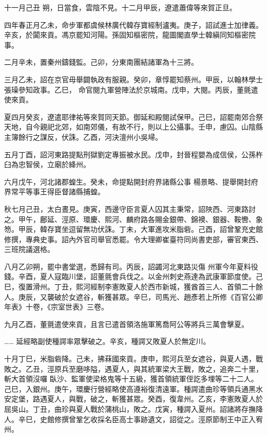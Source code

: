 \begin{pinyinscope}
 十一月己丑
 朔，日當食，雲陰不見。十二月甲辰，遼遣蕭偉等來賀正旦。



 四年春正月乙未，命步軍都虞候林廣代韓存寶經制瀘夷。庚子，詔試進士加律義。辛亥，於闐來貢。馮京罷知河陽。孫固知樞密院，龍圖閣直學士韓縝同知樞密院事。



 二月辛未，置秦州鑄錢監。己卯，分東南團結諸軍為十三將。



 三月乙未，詔在京官毋舉闢執政有服親。癸卯，章惇罷知蔡州。甲辰，以翰林學士張璪參知政事。乙巳，
 命官閱九軍營陣法於京城南。戊申，大閱。丙辰，董氈遣使來貢。



 夏四月癸亥，遼遣耶律祐等來賀同天節。御延和殿閱試保甲。己巳，詔罷南郊合祭天地，自今親祀北郊，如南郊儀，有故不行，則以上公攝事。壬申，慮囚。山陰縣主簿餘行之謀反，伏誅。乙酉，河決澶州小吳埽。



 五月丁酉，詔河東路提點刑獄劉定專振被水民。戊申，封晉程嬰為成信侯，公孫杵臼為忠智侯，立廟於絳州。



 六月戊午，河北諸郡蝗生。癸未，命提點開封府界諸縣公事
 楊景略、提舉開封府界常平等事王得臣督諸縣捕蝗。



 秋七月己丑，太白晝見。庚寅，西邊守臣言夏人囚其主秉常，詔陜西、河東路討之。甲午，鄜延、涇原、環慶、熙河、麟府路各賜金銀帶、錦襖、銀器、鞍轡、象笏。甲辰，韓存寶坐逗留無功伏誅。丁未，大軍進攻米脂砦。己酉，詔曾鞏充史館修撰，專典史事。詔內外官司舉官悉罷。令大理卿崔臺符同尚書吏部，審官東西、三班院議選格。



 八月乙卯朔，罷中書堂選，悉歸有司。丙辰，詔蠲河北東路災傷
 州軍今年夏料役錢。辛酉，夏人寇臨川堡，詔董氈會兵伐之。以金州刺史燕達為武康軍節度使。己巳，復置滑州。丁丑，熙河經制李憲敗夏人於西市新城，獲酋首三人、首領二十餘人。庚辰，又襲破於女遮谷，斬獲甚眾。辛巳，司馬光、趙彥若上所修《百官公卿年表》十卷，《宗室世表》三卷。



 九月乙酉，董氈遣使來貢，且言已遣首領洛施軍篤喬阿公等將兵三萬會擊夏。



 ……
 延經略副使種諤率眾擊破之。辛亥，種諤又敗夏人於無定川。



 十月丁巳，米脂砦降。己未，拂菻國來貢。庚申，熙河兵至女遮谷，與夏人遇，戰敗之。乙丑，涇原兵至磨哆隘，遇夏人，與其統軍梁大王戰，敗之，追奔二十里，斬大首領沒囉
 臥沙、監軍使梁格鬼等十五級，獲首領統軍侄訖多埋等二十二人。己巳，入銀州。庚午，環慶行營經略使高遵裕復清遠軍。種諤遣曲珍等領兵通黑水安定堡，路遇夏人，與戰，破之，斬獲甚眾。癸酉，復韋州。乙亥，李憲敗夏人於屈吳山。丁丑，曲珍與夏人戰於蒲桃山，敗之。戊寅，種諤入夏州。詔諸將存撫降人。辛巳，史館修撰曾鞏乞收採名臣高士事跡遺文，詔從之。涇原節制王中正入宥州。




\end{pinyinscope}

